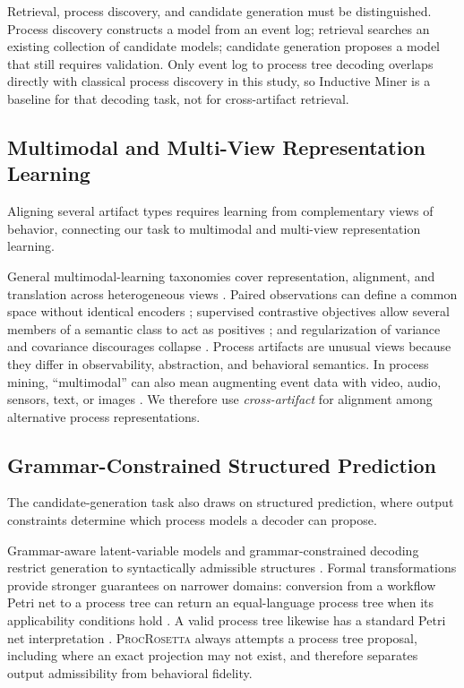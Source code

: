 \documentclass[mathematics,article,submit,moreauthors]{Definitions/mdpi}
\newcommand{\model}{\textsc{ProcRosetta}\xspace}
\begin{document}
Retrieval, process discovery, and candidate generation must be distinguished. Process discovery constructs a model from an event log; retrieval searches an existing collection of candidate models; candidate generation proposes a model that still requires validation. Only event log to process tree decoding overlaps directly with classical process discovery in this study, so Inductive Miner is a baseline for that decoding task, not for cross-artifact retrieval.

\subsection{Multimodal and Multi-View Representation Learning}

Aligning several artifact types requires learning from complementary views of behavior, connecting our task to multimodal and multi-view representation learning.

General multimodal-learning taxonomies cover representation, alignment, and translation across heterogeneous views \cite{Baltrusaitis2019Multimodal}. Paired observations can define a common space without identical encoders \cite{Radford2021}; supervised contrastive objectives allow several members of a semantic class to act as positives \cite{Khosla2020}; and regularization of variance and covariance discourages collapse \cite{Bardes2022}. Process artifacts are unusual views because they differ in observability, abstraction, and behavioral semantics. In process mining, ``multimodal'' can also mean augmenting event data with video, audio, sensors, text, or images \cite{Gavric2025MultimodalEvidence,Pasquadibisceglie2026MultimodalPPM}. We therefore use \emph{cross-artifact} for alignment among alternative process representations.

\subsection{Grammar-Constrained Structured Prediction}

The candidate-generation task also draws on structured prediction, where output constraints determine which process models a decoder can propose.

Grammar-aware latent-variable models and grammar-constrained decoding restrict generation to syntactically admissible structures \cite{Kusner2017GrammarVAE,Geng2023}. Formal transformations provide stronger guarantees on narrower domains: conversion from a workflow Petri net to a process tree can return an equal-language process tree when its applicability conditions hold \cite{vanZelst2020NetToTree}. A valid process tree likewise has a standard Petri net interpretation \cite{vanDerAalst2016}. \model always attempts a process tree proposal, including where an exact projection may not exist, and therefore separates output admissibility from behavioral fidelity.
\end{document}
